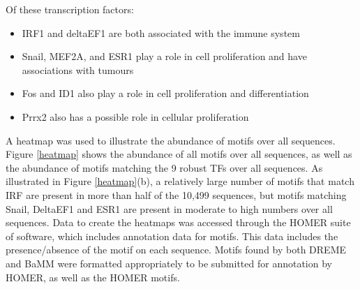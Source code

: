 \documentclass[12pt]{article}
\begin{document}
Of these transcription factors:
\begin{itemize}
\item IRF1 and deltaEF1 are both associated with the immune system
\item Snail, MEF2A, and ESR1 play a role in cell proliferation and have associations with tumours
\item Fos and ID1 also play a role in cell proliferation and  differentiation
\item Prrx2 also has a possible role in cellular proliferation
\end{itemize} 

A heatmap was used to illustrate the abundance of motifs over all sequences. Figure \ref{heatmap} shows the abundance of all motifs over all sequences, as well as the abundance of motifs matching the 9 robust TFs over all sequences. As illustrated in Figure \ref{heatmap}(b), a relatively large number of motifs that match IRF are present in more than half of the 10,499 sequences, but motifs matching Snail, DeltaEF1 and ESR1 are present in moderate to high numbers over all sequences. Data to create the heatmaps was accessed through the HOMER suite of software, which includes annotation data for motifs. This data includes the presence/absence of the motif on each sequence. Motifs found by both DREME and BaMM were formatted appropriately to be submitted for annotation by HOMER, as well as the HOMER motifs.
\end{document}
